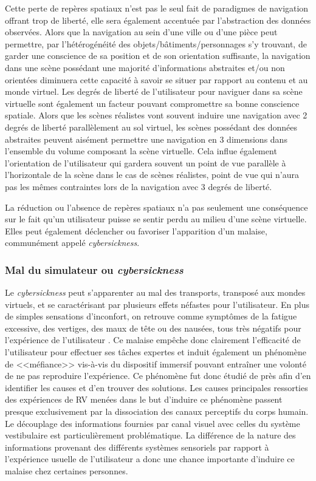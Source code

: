 Cette perte de repères spatiaux n'est pas le seul fait de paradigmes de navigation offrant trop de liberté, elle sera également accentuée par l'abstraction des données observées. Alors que la navigation au sein d'une ville ou d'une pièce peut permettre, par l'hétérogénéité des objets/bâtiments/personnages s'y trouvant, de garder une conscience de sa position et de son orientation suffisante, la navigation dans une scène possédant une majorité d'informations abstraites et/ou non orientées diminuera cette capacité à savoir se situer par rapport au contenu et au monde virtuel. Les degrés de liberté de l'utilisateur pour naviguer dans sa scène virtuelle sont également un facteur pouvant compromettre sa bonne conscience spatiale. Alors que les scènes réalistes vont souvent induire une navigation avec 2 degrés de liberté parallèlement au sol virtuel, les scènes possédant des données abstraites peuvent aisément permettre une navigation en 3 dimensions dans l'ensemble du volume composant la scène virtuelle. Cela influe également l'orientation de l'utilisateur qui gardera souvent un point de vue parallèle à l'horizontale de la scène dans le cas de scènes réalistes, point de vue qui n'aura pas les mêmes contraintes lors de la navigation avec 3 degrés de liberté.

La réduction ou l'absence de repères spatiaux n'a pas seulement une conséquence sur le fait qu'un utilisateur puisse se sentir perdu au milieu d'une scène virtuelle. Elles peut également déclencher ou favoriser l'apparition d'un malaise, communément appelé \textit{cybersickness}. 

\subsubsection{Mal du simulateur ou \textit{cybersickness}} \label{cybersickness}

Le \textit{cybersickness} peut s'apparenter au mal des transports, transposé aux mondes virtuels, et se caractérisant par plusieurs effets néfastes pour l'utilisateur. En plus de simples sensations d'inconfort, on retrouve comme symptômes de la fatigue excessive, des vertiges, des maux de tête ou des nausées, tous très négatifs pour l'expérience de l'utilisateur \cite{kolasinski1995simulator,laviola_jr_discussion_2000}. Ce malaise empêche donc clairement l'efficacité de l'utilisateur pour effectuer ses tâches expertes et induit également un phénomène de <<méfiance>> vis-à-vis du dispositif immersif pouvant entraîner une volonté de ne pas reproduire l'expérience. Ce phénomène fut donc étudié de près afin d'en identifier les causes et d'en trouver des solutions. Les causes principales ressorties des expériences de RV menées dans le but d'induire ce phénomène passent presque exclusivement par la dissociation des canaux perceptifs du corps humain. Le découplage des informations fournies par canal visuel avec celles du système vestibulaire est particulièrement problématique. La différence de la nature des informations provenant des différents systèmes sensoriels par rapport à l'expérience usuelle de l'utilisateur a donc une chance importante d'induire ce malaise chez certaines personnes\cite{reason1975motion}.

